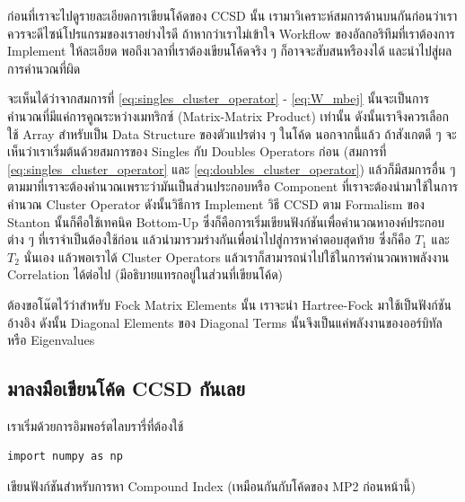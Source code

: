 ก่อนที่เราจะไปดูรายละเอียดการเขียนโค้ดของ CCSD นั้น เรามาวิเคราะห์สมการด้านบนกันก่อนว่าเราควรจะดีไซน์โปรแกรมของเราอย่างไรดี
ถ้าหากว่าเราไม่เข้าใจ Workflow ของอัลกอริทึมที่เราต้องการ Implement ให้ละเอียด พอถึงเวลาที่เราต้องเขียนโค้ดจริง ๆ ก็อาจจะสับสนหรืองงได้
และนำไปสู่ผลการคำนวณที่ผิด

จะเห็นได้ว่าจากสมการที่ \eqref{eq:singles_cluster_operator} - \eqref{eq:W_mbej} นั้นจะเป็นการคำนวณที่มีแค่การคูณระหว่างเมทริกซ์
(Matrix-Matrix Product) เท่านั้น ดังนั้นเราจึงควรเลือกใช้ Array สำหรับเป็น Data Structure ของตัวแปรต่าง ๆ ในโค้ด นอกจากนี้แล้ว%
ถ้าสังเกตดี ๆ จะเห็นว่าเราเริ่มต้นด้วยสมการของ Singles กับ Doubles Operators ก่อน (สมการที่ \eqref{eq:singles_cluster_operator}
และ \eqref{eq:doubles_cluster_operator}) แล้วก็มีสมการอื่น ๆ ตามมาที่เราจะต้องคำนวณเพราะว่ามันเป็นส่วนประกอบหรือ Component
ที่เราจะต้องนำมาใช้ในการคำนวณ Cluster Operator ดังนั้นวิธีการ Implement วิธี CCSD ตาม Formalism ของ Stanton นั้นก็คือใช้เทคนิค
Bottom-Up ซึ่งก็คือการเริ่มเขียนฟังก์ชันเพื่อคำนวณหาองค์ประกอบต่าง ๆ ที่เราจำเป็นต้องใช้ก่อน แล้วนำมารวมร่างกันเพื่อนำไปสู่การหาคำตอบสุดท้าย
ซึ่งก็คือ $T_{1}$ และ $T_{2}$ นั่นเอง แล้วพอเราได้ Cluster Operators แล้วเราก็สามารถนำไปใช้ในการคำนวณหาพลังงาน Correlation
ได้ต่อไป (มีอธิบายแทรกอยู่ในส่วนที่เขียนโค้ด)

ต้องขอโน๊ตไว้ว่าสำหรับ Fock Matrix Elements นั้น เราจะนำ Hartree-Fock มาใช้เป็นฟังก์ชันอ้างอิง ดังนั้น Diagonal Elements ของ
Diagonal Terms นั้นจึงเป็นแค่พลังงานของออร์บิทัลหรือ Eigenvalues

\subsection{มาลงมือเขียนโค้ด CCSD กันเลย}

\vspace{5pt}

\noindent เราเริ่มด้วยการอิมพอร์ตไลบรารี่ที่ต้องใช้

\vspace{5pt}

\begin{lstlisting}[style=MyPython]
import numpy as np
\end{lstlisting}

\vspace{5pt}

\noindent เขียนฟังก์ชันสำหรับการหา Compound Index (เหมือนกันกับโค้ดของ MP2 ก่อนหน้านี้)

\vspace{5pt}

